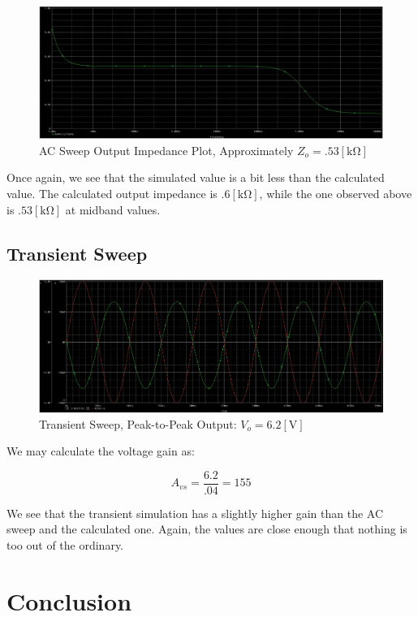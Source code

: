 \documentclass[
	letterpaper, %
	10pt, %
]{CSUniSchoolLabReport}
\begin{document}
\begin{figure}[H]
  \centering
  \includegraphics[width=.9\textwidth]{Figures/HW89-PartG}
  \caption{AC Sweep Output Impedance Plot, Approximately $Z_o=.53[\si{\kilo\ohm}]$}
  \label{fig:9}
\end{figure}

Once again, we see that the simulated value is a bit less than the calculated value. The calculated output impedance is $.6[\si{\kilo\ohm}]$, while the one observed above is $.53[\si{\kilo\ohm}]$ at midband values.

\subsection{Transient Sweep}

\begin{figure}[H]
  \centering
  \includegraphics[width=.9\textwidth]{Figures/HW89-PartH}
  \caption{Transient Sweep, Peak-to-Peak Output: $V_o=6.2[\si{\volt}]$}
  \label{fig:10}
\end{figure}

We may calculate the voltage gain as:

$$\boxed{A_{vs}=\frac{6.2}{.04}=155}$$

We see that the transient simulation has a slightly higher gain than the AC sweep and the calculated one. Again, the values are close enough that nothing is too out of the ordinary.

\section{Conclusion}
\end{document}
